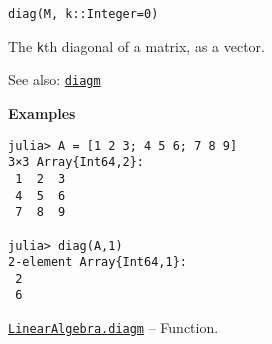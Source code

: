 \begin{adjustwidth}{2em}{0pt}


\begin{verbatim}
diag(M, k::Integer=0)
\end{verbatim}

The \texttt{k}th diagonal of a matrix, as a vector.

See also: \hyperlink{18133091318829836689}{\texttt{diagm}}

\textbf{Examples}


\begin{verbatim}
julia> A = [1 2 3; 4 5 6; 7 8 9]
3×3 Array{Int64,2}:
 1  2  3
 4  5  6
 7  8  9

julia> diag(A,1)
2-element Array{Int64,1}:
 2
 6
\end{verbatim}



\end{adjustwidth}
\hypertarget{18133091318829836689}{} 
\hyperlink{18133091318829836689}{\texttt{LinearAlgebra.diagm}}  -- {Function.}

